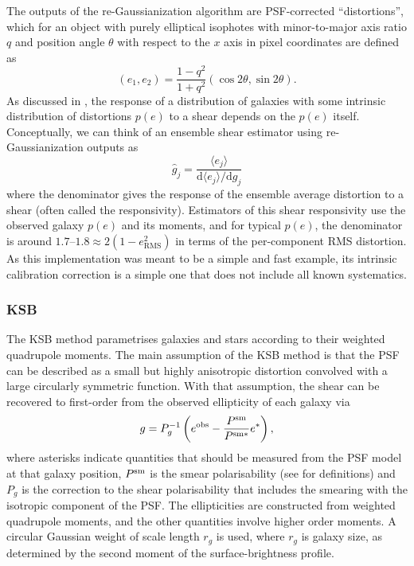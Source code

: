 \documentclass[iop]{emulateapj}
\newcommand\rmcomment[1]{\textcolor{red}{(RM: #1)}}
\begin{document}
The outputs of the re-Gaussianization algorithm are PSF-corrected
``distortions'', which for an object with purely elliptical isophotes
with minor-to-major axis ratio $q$ and position angle $\theta$ with
respect to the $x$ axis in pixel coordinates are defined as
\begin{equation}
(e_1, e_2) = \frac{1-q^2}{1+q^2}\left(\cos{2\theta},\sin{2\theta}\right).
\end{equation}
As discussed in \cite{2002AJ....123..583B}, the response of a
distribution of galaxies with some intrinsic distribution of
distortions $p(e)$ to a shear %
depends on
the $p(e)$ itself.  Conceptually, we can think of an ensemble shear
estimator using re-Gaussianization outputs as
\begin{equation}
\hat{g}_j = \frac{\langle e_j\rangle}{\mathrm{d}\langle e_j\rangle/\mathrm{d}g_j}
\end{equation}
where the denominator gives the response of the ensemble average
distortion to a shear (often called the responsivity).  Estimators of
this shear responsivity use the observed galaxy $p(e)$ and its
moments, and for typical $p(e)$, the denominator is around
$1.7$--$1.8\approx 2 (1-e_\text{RMS}^2)$ in terms of the per-component
RMS distortion. As this implementation was meant to be a simple and
fast example, its intrinsic calibration correction is a simple one
that does not include all known systematics.


\subsubsection{KSB}

The KSB method \citep{1995ApJ...449..460K} parametrises galaxies and
stars according to their weighted quadrupole moments.  The main
assumption of the KSB method is that the PSF can be described as a
small but highly anisotropic distortion convolved with a large
circularly symmetric function.  With that assumption, the shear can be
recovered to first-order from the observed ellipticity of each galaxy
via
\begin{equation} \label{eqn:weight}
g=P_{g}^{-1}\left(e^{\rm obs}-\frac{P^{\rm sm}}{P^{\rm sm*}}e^{*}\right),
\end{equation}
where asterisks indicate quantities that should be measured from the
PSF model at that galaxy position, $P^{\rm sm}$ is the smear
polarisability (see \citealt{2006MNRAS.368.1323H} for definitions) and
$P_g$ is the correction to the shear polarisability that includes
the smearing with the isotropic component of the PSF. The
ellipticities are constructed from weighted quadrupole moments, and
the other quantities involve higher order moments. A circular Gaussian
weight of scale length $r_g$ is used, where $r_g$ is galaxy size, as
determined by the second moment of the surface-brightness profile. 
\end{document}
